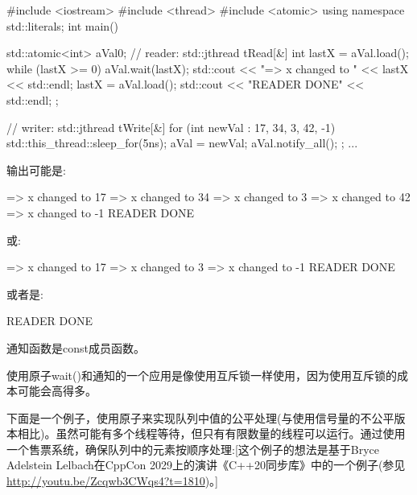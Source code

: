 \begin{cpp}
#include <iostream>
#include <thread>
#include <atomic>
using namespace std::literals;
int main()
{
	std::atomic<int> aVal{0};
	// reader:
	std::jthread tRead{[&] {
						int lastX = aVal.load();
						while (lastX >= 0) {
							aVal.wait(lastX);
							std::cout << "=> x changed to " << lastX << std::endl;
							lastX = aVal.load();
						}
						std::cout << "READER DONE" << std::endl;
				}};

	// writer:
	std::jthread tWrite{[&] {
						for (int newVal : { 17, 34, 3, 42, -1}) {
							std::this_thread::sleep_for(5ns);
							aVal = newVal;
							aVal.notify_all();
						}
				}};
	...
}
\end{cpp}

输出可能是:

\begin{shell}
=> x changed to 17
=> x changed to 34
=> x changed to 3
=> x changed to 42
=> x changed to -1
READER DONE
\end{shell}

或:

\begin{shell}
=> x changed to 17
=> x changed to 3
=> x changed to -1
READER DONE
\end{shell}

或者是:

\begin{shell}
READER DONE
\end{shell}

通知函数是const成员函数。


使用原子wait()和通知的一个应用是像使用互斥锁一样使用，因为使用互斥锁的成本可能会高得多。

下面是一个例子，使用原子来实现队列中值的公平处理(与使用信号量的不公平版本相比)。虽然可能有多个线程等待，但只有有限数量的线程可以运行。通过使用一个售票系统，确保队列中的元素按顺序处理:[这个例子的想法是基于Bryce Adelstein Lelbach在CppCon 2029上的演讲《C++20同步库》中的一个例子(参见\url{http://youtu.be/Zcqwb3CWqs4?t=1810})。]


